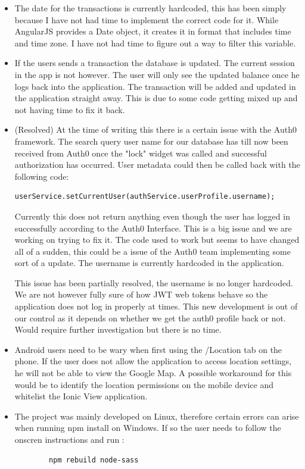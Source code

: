 \begin{itemize}
\begin{center}
    \end{center}
    \item The date for the transactions is currently hardcoded, this has been simply because I have not had time to implement the correct code for it. While AngularJS provides a Date object, it creates it in format that includes time and time zone. I have not had time to figure out a way to filter this variable.
    \item If the users sends a transaction the database is updated. The current session in the app is not however. The user will only see the updated balance once he logs back into the application. The transaction will be added and updated in the application straight away.
    This is due to some code getting mixed up and not having time to fix it back.
    \item (Resolved) At the time of writing this there is a certain issue with the Auth0 framework. 
    The search query user name for our database has till now been received from Auth0 once the "lock" widget was called and successful authorization has occurred. User metadata could then be called back with the following code:

\begin{verbatim}
userService.setCurrentUser(authService.userProfile.username);
\end{verbatim}
    Currently this does not return anything even though the user has logged in successfully according to the Auth0 Interface. This is a big issue and we are working on trying to fix it. 
    The code used to work but seems to have changed all of a sudden, this could be a issue of the Auth0 team implementing some sort of a update. The username is currently hardcoded in the application.
    
    This issue has been partially resolved, the username is no longer hardcoded. We are not however fully sure of how JWT web tokens behave so the application does not log in properly at times. This new development is out of our control as it depends on whether we get the auth0 profile back or not. Would require further investigation but there is no time.
    
    \item Android users need to be wary when first using the /Location tab on the phone. If the user does not allow the application to access location settings, he will not be able to view the Google Map. A possible workaround for this would be to identify the location permissions on the mobile device and whitelist the Ionic View application.
    
    \item The project was mainly developed on Linux, therefore certain errors can arise when running npm install on Windows. If so the user needs to follow the onscren instructions and run :
    \begin{verbatim}
        npm rebuild node-sass
    \end{verbatim}


\end{itemize}
